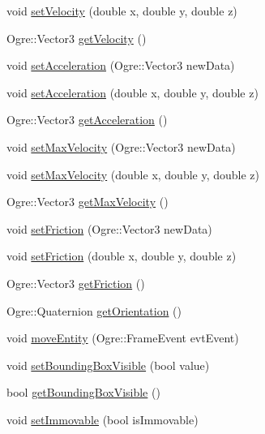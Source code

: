 \begin{DoxyCompactItemize}
\item 
void \hyperlink{class_rad_xml_1_1_movable_ad71ae5b248b38a93ad99a7f824a74a19}{set\-Velocity} (double x, double y, double z)
\item 
Ogre\-::\-Vector3 \hyperlink{class_rad_xml_1_1_movable_aeccf663ffc43f47f310dca34f4693844}{get\-Velocity} ()
\item 
void \hyperlink{class_rad_xml_1_1_movable_aae58f1fc4aaa90cf7d10784e508c74db}{set\-Acceleration} (Ogre\-::\-Vector3 new\-Data)
\item 
void \hyperlink{class_rad_xml_1_1_movable_a0acd18b2e9166e104b5a6c52d14ced96}{set\-Acceleration} (double x, double y, double z)
\item 
Ogre\-::\-Vector3 \hyperlink{class_rad_xml_1_1_movable_a306b17ef1a30f37ac5b5e7b1eb1bdcb5}{get\-Acceleration} ()
\item 
void \hyperlink{class_rad_xml_1_1_movable_a4c3b16c72ae91ae49759056f8d497c35}{set\-Max\-Velocity} (Ogre\-::\-Vector3 new\-Data)
\item 
void \hyperlink{class_rad_xml_1_1_movable_aae6d83b64a2bc5b7c5fee36c1d7578d2}{set\-Max\-Velocity} (double x, double y, double z)
\item 
Ogre\-::\-Vector3 \hyperlink{class_rad_xml_1_1_movable_a882e0c59107b0eb7d394129eac66100a}{get\-Max\-Velocity} ()
\item 
void \hyperlink{class_rad_xml_1_1_movable_afe0b9b99290454963eb20b504033579c}{set\-Friction} (Ogre\-::\-Vector3 new\-Data)
\item 
void \hyperlink{class_rad_xml_1_1_movable_a4fd2a01d0323682b86e9268272d18d76}{set\-Friction} (double x, double y, double z)
\item 
Ogre\-::\-Vector3 \hyperlink{class_rad_xml_1_1_movable_a1a1ec82d75b5cbed77ab01315dff597d}{get\-Friction} ()
\item 
Ogre\-::\-Quaternion \hyperlink{class_rad_xml_1_1_movable_afa9b2f8bb1e0eeb6f7992e2a73d24d6a}{get\-Orientation} ()
\item 
void \hyperlink{class_rad_xml_1_1_movable_a0dfd632dd159425d2c6c1447a8ee4fdc}{move\-Entity} (Ogre\-::\-Frame\-Event evt\-Event)
\item 
void \hyperlink{class_rad_xml_1_1_movable_ae8e3f0777c50764ba2aeef9080e51f59}{set\-Bounding\-Box\-Visible} (bool value)
\item 
bool \hyperlink{class_rad_xml_1_1_movable_ac1660599e097d8fa759759dce9f6a58d}{get\-Bounding\-Box\-Visible} ()
\item 
void \hyperlink{class_rad_xml_1_1_movable_a4bca04b2055fb61297d572ef3a0082bd}{set\-Immovable} (bool is\-Immovable)

\end{DoxyCompactItemize}
